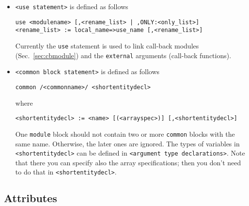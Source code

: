 \begin{itemize}
\item \texttt{<use statement>} is defined as follows 
\begin{verbatim}
use <modulename> [,<rename_list> | ,ONLY:<only_list>]
<rename_list> := local_name=>use_name [,<rename_list>]
\end{verbatim}
  Currently the \texttt{use} statement is used to link call-back
  modules (Sec.~\ref{sec:cbmodule}) and the \texttt{external}
  arguments (call-back functions).

\item \texttt{<common block statement>} is defined as follows 
\begin{verbatim}
common /<commonname>/ <shortentitydecl>
\end{verbatim}
where
\begin{verbatim}
<shortentitydecl> := <name> [(<arrayspec>)] [,<shortentitydecl>]
\end{verbatim}
One \texttt{module} block should not contain two or more
\texttt{common} blocks with the same name. Otherwise, the later ones
are ignored.  The types of variables in \texttt{<shortentitydecl>} can
be defined in \texttt{<argument type declarations>}. Note that there
you can specify also the array specifications; then you don't need to
do that in \texttt{<shortentitydecl>}.
\end{itemize}

\subsection{Attributes}
\label{sec:attributes}

